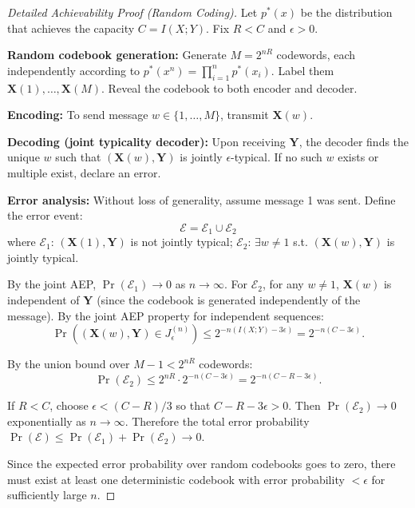 \begin{proof}[Detailed Achievability Proof (Random Coding)]
Let $p^*(x)$ be the distribution that achieves the capacity $C = I(X;Y)$. Fix $R < C$ and $\epsilon > 0$.

\textbf{Random codebook generation:} Generate $M = 2^{nR}$ codewords, each independently according to $p^*(x^n) = \prod_{i=1}^n p^*(x_i)$. Label them $\mathbf{X}(1), \dots, \mathbf{X}(M)$. Reveal the codebook to both encoder and decoder.

\textbf{Encoding:} To send message $w \in \{1,\dots,M\}$, transmit $\mathbf{X}(w)$.

\textbf{Decoding (joint typicality decoder):} Upon receiving $\mathbf{Y}$, the decoder finds the unique $w$ such that $(\mathbf{X}(w), \mathbf{Y})$ is jointly $\epsilon$-typical. If no such $w$ exists or multiple exist, declare an error.

\textbf{Error analysis:} Without loss of generality, assume message 1 was sent. Define the error event:
\[
\mathcal{E} = \mathcal{E}_1 \cup \mathcal{E}_2
\]
where $\mathcal{E}_1$: $(\mathbf{X}(1), \mathbf{Y})$ is not jointly typical; $\mathcal{E}_2$: $\exists w \neq 1$ s.t. $(\mathbf{X}(w), \mathbf{Y})$ is jointly typical.

By the joint AEP, $\Pr(\mathcal{E}_1) \to 0$ as $n \to \infty$. For $\mathcal{E}_2$, for any $w \neq 1$, $\mathbf{X}(w)$ is independent of $\mathbf{Y}$ (since the codebook is generated independently of the message). By the joint AEP property for independent sequences:
\[
\Pr((\mathbf{X}(w), \mathbf{Y}) \in J_\epsilon^{(n)}) \le 2^{-n(I(X;Y)-3\epsilon)} = 2^{-n(C-3\epsilon)}.
\]

By the union bound over $M-1 < 2^{nR}$ codewords:
\[
\Pr(\mathcal{E}_2) \le 2^{nR} \cdot 2^{-n(C-3\epsilon)} = 2^{-n(C-R-3\epsilon)}.
\]

If $R < C$, choose $\epsilon < (C-R)/3$ so that $C-R-3\epsilon > 0$. Then $\Pr(\mathcal{E}_2) \to 0$ exponentially as $n \to \infty$. Therefore the total error probability $\Pr(\mathcal{E}) \le \Pr(\mathcal{E}_1) + \Pr(\mathcal{E}_2) \to 0$.

Since the expected error probability over random codebooks goes to zero, there must exist at least one deterministic codebook with error probability $< \epsilon$ for sufficiently large $n$.
\end{proof}

